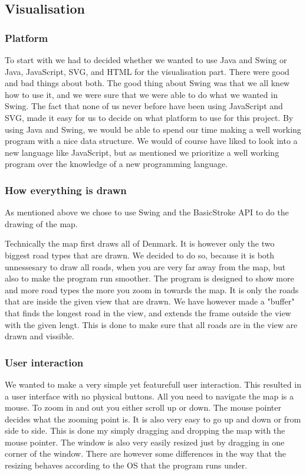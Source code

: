 \documentclass[a4paper,11pt]{article}
\begin{document}
\subsection{Visualisation} %
\label{sub:Visualisation}


\subsubsection{Platform} %
\label{subsub:Platform}
To start with we had to decided whether we wanted to use Java and Swing or Java, JavaScript, SVG, and HTML for the visualisation part. There were good and bad things about both. The good thing about Swing was that we all knew how to use it, and we were sure that we were able to do what we wanted in Swing.
The fact that none of us never before have been using JavaScript and SVG, made it easy for us to decide on what platform to use for this project. By using Java and Swing, we would be able to spend our time making a well working program with a nice data structure. We would of course have liked to look into a new language like JavaScript, but as mentioned we prioritize a well working program over the knowledge of a new programming language.

\subsubsection{How everything is drawn} %
\label{subsub:How everything is drawn}
As mentioned above we chose to use Swing and the BasicStroke API to do the drawing of the map. 

Technically the map first draws all of Denmark. It is however only the two biggest road types that are drawn. We decided to do so, because it is both unnessesary to draw all roads, when you are very far away from the map, but also to make the program run smoother. The program is designed to show more and more road types the more you zoom in towards the map. It is only the roads that are inside the given view that are drawn. We have however made a "buffer" that finds the longest road in the view, and extends the frame outside the view with the given lengt. This is done to make sure that all roads are in the view are drawn and vissible.

\subsubsection{User interaction} %
\label{subsub:User interaction}
We wanted to make a very simple yet featurefull user interaction. This resulted in a user interface with no physical buttons. All you need to navigate the map is a mouse. To zoom in and out you either scroll up or down. The mouse pointer decides what the zooming point is. It is also very easy to go up and down or from side to side. This is done my simply dragging and dropping the map with the mouse pointer. The window is also very easily resized just by dragging in one corner of the window. There are however some differences in the way that the resizing behaves according to the OS that the program runs under.
\end{document}
